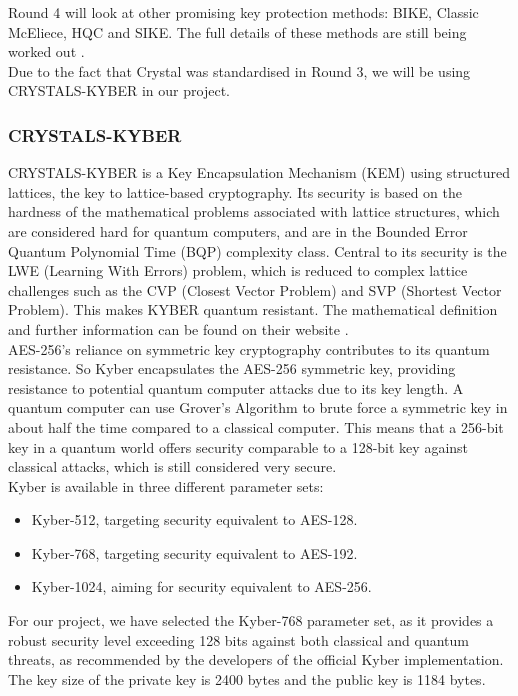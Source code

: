 Round 4 will look at other promising key protection methods:
BIKE, Classic McEliece, HQC and SIKE. The full details of these methods are still being worked out \cite{nist2023postquantum}.\\

Due to the fact that Crystal was standardised in Round 3, we will be using CRYSTALS-KYBER in our project.

\subsubsection{CRYSTALS-KYBER}
CRYSTALS-KYBER is a Key Encapsulation Mechanism (KEM) using structured lattices, the key to lattice-based cryptography. Its security is based on the hardness of the mathematical problems associated with lattice structures, which are considered hard for quantum computers, and are in the Bounded Error Quantum Polynomial Time (BQP) complexity class. Central to its security is the LWE (Learning With Errors) problem, which is reduced to complex lattice challenges such as the CVP (Closest Vector Problem) and SVP (Shortest Vector Problem). This makes KYBER quantum resistant. The mathematical definition and further information can be found on their website \cite{pqcrystals}. \\


AES-256's reliance on symmetric key cryptography contributes to its quantum resistance. So Kyber encapsulates the AES-256 symmetric key, providing resistance to potential quantum computer attacks due to its key length. A quantum computer can use Grover's Algorithm \cite{geeksforgeeks2023grovers} to brute force a symmetric key in about half the time compared to a classical computer. This means that a 256-bit key in a quantum world offers security comparable to a 128-bit key against classical attacks, which is still considered very secure. \\
Kyber is available in three different parameter sets:

\begin{itemize}
	\item Kyber-512, targeting security equivalent to AES-128.
	\item Kyber-768, targeting security equivalent to AES-192.
	\item Kyber-1024, aiming for security equivalent to AES-256.
\end{itemize}

For our project, we have selected the Kyber-768 parameter set, as it provides a robust security level exceeding 128 bits against
both classical and quantum threats, as recommended by the developers of the official Kyber implementation. The key size of the private key is 2400 bytes and the public key is 1184 bytes. \\

